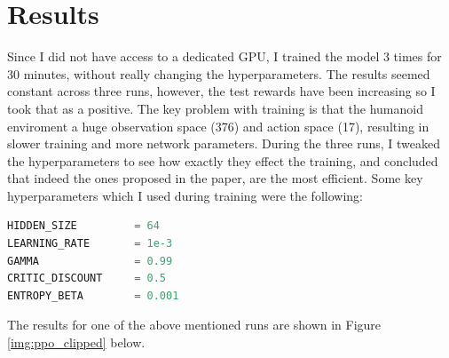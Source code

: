 \documentclass[12pt,a4paper]{article}
\begin{document}
\section{Results}\label{results}

Since I did not have access to a dedicated GPU, I trained the model 3 times for 30 minutes, without really changing the hyperparameters. The results seemed constant across three runs, however, the test rewards have been increasing so I took that as a positive. The key problem with training is that the humanoid enviroment a huge observation space (376) and action space (17), resulting in slower training and more network parameters. During the three runs, I tweaked the hyperparameters to see how exactly they effect the training, and concluded that indeed the ones proposed in the paper, are the most efficient. Some key hyperparameters which I used during training were the following:  
\begin{lstlisting}[language=Python]
HIDDEN_SIZE         = 64
LEARNING_RATE       = 1e-3
GAMMA               = 0.99
CRITIC_DISCOUNT     = 0.5
ENTROPY_BETA        = 0.001
\end{lstlisting}
The results  for one of the above mentioned runs are shown in Figure \ref{img:ppo_clipped} below. 
\end{document}
